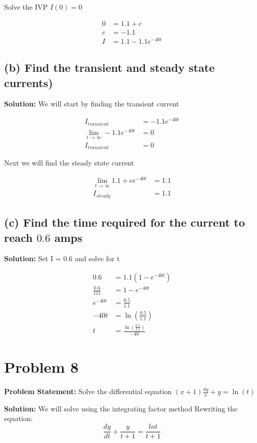 \documentclass[12pt, letterpaper]{article}
\begin{document}
Solve the IVP $I(0) = 0$

\begin{align*}
0 &= 1.1 + c \\
c &= -1.1 \\
I &= 1.1 - 1.1e^{-40t}
\end{align*}


\subsection*{(b) Find the transient and steady state currents)}

\textbf{Solution:} We will start by finding the transient current

\begin{align*}
I_{transient} &= -1.1e^{-40t} \\
\lim_{t \to \infty} -1.1e^{-40t} &= 0 \\
I_{transient} &= 0
\end{align*}

Next we will find the steady state current

\begin{align*}
\lim_{t \to \infty} 1.1 + ce^{-40t} &= 1.1 \\
I_{steady} &= 1.1
\end{align*}

\subsection*{(c) Find the time required for the current to reach $0.6$ amps}

\textbf{Solution:} Set I = 0.6 and solve for t

\begin{align*}
0.6 &= 1.1(1 - e^{-40t}) \\
\frac{0.6}{111} &= 1 - e^{-40t} \\
e^{-40t} &= \frac{0.5}{1.1} \\
-40t &= \ln(\frac{0.5}{1.1}) \\
t &= \frac{\ln(\frac{0.5}{1.1})}{-40}
\end{align*}

\section*{Problem 8}
\textbf{Problem Statement:} Solve the differential equation $(x+1)\frac{dy}{x}+y = \ln(t)$

\textbf{Solution:} We will solve using the integrating factor method
Rewriting the equation:
\[
\frac{dy}{dt} + \frac{y}{t+1} = \frac{lnt}{t+1}
\]
\end{document}

